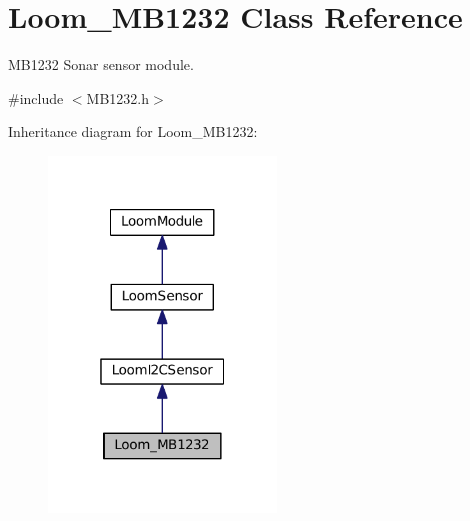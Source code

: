 \hypertarget{class_loom___m_b1232}{}\section{Loom\+\_\+\+M\+B1232 Class Reference}
\label{class_loom___m_b1232}


M\+B1232 Sonar sensor module.  




{\ttfamily \#include $<$M\+B1232.\+h$>$}



Inheritance diagram for Loom\+\_\+\+M\+B1232\+:\nopagebreak
\begin{figure}[H]
\begin{center}
\leavevmode
\includegraphics[width=172pt]{class_loom___m_b1232__inherit__graph}
\end{center}
\end{figure}
